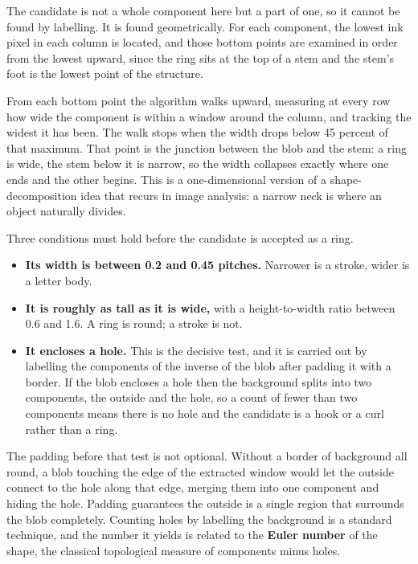 The candidate is not a whole component here but a part of one, so it cannot be found by labelling. It is found geometrically. For each component, the lowest ink pixel in each column is located, and those bottom points are examined in order from the lowest upward, since the ring sits at the top of a stem and the stem's foot is the lowest point of the structure.

From each bottom point the algorithm walks upward, measuring at every row how wide the component is within a window around the column, and tracking the widest it has been. The walk stops when the width drops below 45 percent of that maximum. That point is the junction between the blob and the stem: a ring is wide, the stem below it is narrow, so the width collapses exactly where one ends and the other begins. This is a one-dimensional version of a shape-decomposition idea that recurs in image analysis: a narrow neck is where an object naturally divides.


Three conditions must hold before the candidate is accepted as a ring.


\begin{itemize}\setlength\itemsep{0pt}
  \item \textbf{Its width is between 0.2 and 0.45 pitches.} Narrower is a stroke, wider is a letter body.
  \item \textbf{It is roughly as tall as it is wide,} with a height-to-width ratio between 0.6 and 1.6. A ring is round; a stroke is not.
  \item \textbf{It encloses a hole.} This is the decisive test, and it is carried out by labelling the components of the inverse of the blob after padding it with a border. If the blob encloses a hole then the background splits into two components, the outside and the hole, so a count of fewer than two components means there is no hole and the candidate is a hook or a curl rather than a ring.
\end{itemize}
The padding before that test is not optional. Without a border of background all round, a blob touching the edge of the extracted window would let the outside connect to the hole along that edge, merging them into one component and hiding the hole. Padding guarantees the outside is a single region that surrounds the blob completely. Counting holes by labelling the background is a standard technique, and the number it yields is related to the \textbf{Euler number} of the shape, the classical topological measure of components minus holes.



